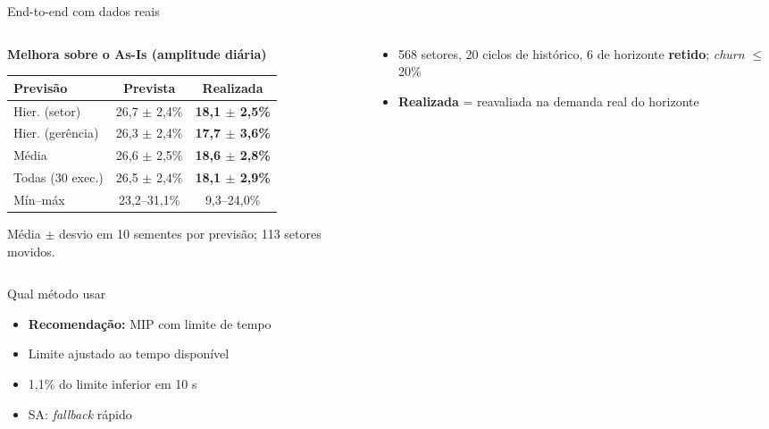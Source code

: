 \documentclass[aspectratio=169,11pt]{beamer}
\begin{document}
\begin{frame}{End-to-end com dados reais}
  \footnotesize
  \begin{columns}[T]
    \begin{column}{0.5\textwidth}
      \centering
      \textbf{Melhora sobre o As-Is (amplitude diária)}\par
      \vspace{0.3em}
      \begin{tabular}{lcc}
        \toprule
        Previsão & Prevista & \textbf{Realizada} \\
        \midrule
        Hier. (setor) & 26,7 $\pm$ 2,4\% & \textbf{18,1 $\pm$ 2,5\%} \\
        Hier. (gerência) & 26,3 $\pm$ 2,4\% & \textbf{17,7 $\pm$ 3,6\%} \\
        Média        & 26,6 $\pm$ 2,5\% & \textbf{18,6 $\pm$ 2,8\%} \\
        \midrule
        Todas (30 exec.) & 26,5 $\pm$ 2,4\% & \textbf{18,1 $\pm$ 2,9\%} \\
        Mín--máx             & 23,2--31,1\%    & 9,3--24,0\% \\
        \bottomrule
      \end{tabular}
      {\scriptsize Média $\pm$ desvio em 10 sementes por previsão; 113 setores movidos.\par}
    \end{column}
    \begin{column}{0.46\textwidth}
      \begin{itemize}
        \item 568 setores, 20 ciclos de histórico, 6 de horizonte \textbf{retido}; \textit{churn} $\le$ 20\%
        \item \textbf{Realizada} = reavaliada na demanda real do horizonte
      \end{itemize}
    \end{column}
  \end{columns}
\end{frame}

\begin{frame}{Qual método usar}
  \begin{itemize}
    \item \textbf{Recomendação:} MIP com limite de tempo
    \item Limite ajustado ao tempo disponível
    \item 1,1\% do limite inferior em 10 s
    \item SA: \textit{fallback} rápido
  \end{itemize}
\end{frame}
\end{document}
